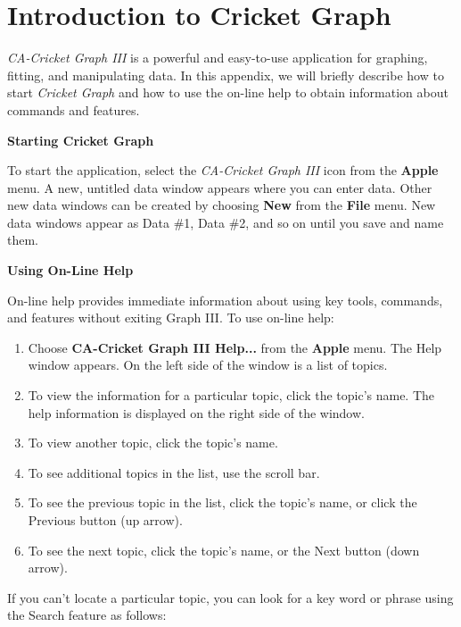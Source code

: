
\section{Introduction to Cricket Graph}

\textit{CA-Cricket Graph III} is a powerful and easy-to-use application for
graphing, fitting, and manipulating data. In this appendix, we will briefly
describe how to start \textit{Cricket Graph} and how to use the on-line help
to obtain information about commands and features.

\textbf{Starting Cricket Graph }

To start the application, select the \textit{CA-Cricket Graph III} icon from
the \textbf{Apple} menu. A new, untitled data window appears where you can enter
data. Other new data windows can be created by choosing \textbf{New} from the
\textbf{File} menu. New data windows appear as Data \#1, Data \#2, and so on
until you save and name them.

\textbf{Using On-Line Help} 

On-line help provides immediate information about using key tools, commands,
and features without exiting Graph III. To use on-line help: 

\begin{enumerate}
\item Choose \textbf{CA-Cricket Graph III Help...} from the \textbf{Apple} menu. The
Help window appears. On the left side of the window is a list of topics. 
\item To view the information for a particular topic, click the topic's name. The
help information is displayed on the right side of the window. 
\item To view another topic, click the topic's name. 
\item To see additional topics in the list, use the scroll bar. 
\item To see the previous topic in the list, click the topic's name, or click the
Previous button (up arrow). 
\item To see the next topic, click the topic's name, or the Next button (down arrow).
\end{enumerate}
If you can't locate a particular topic, you can look for a key word or phrase
using the Search feature as follows: 

